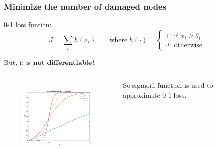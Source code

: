 \documentclass{beamer}
\begin{document}
\begin{frame}
	\frametitle{Minimize the number of damaged nodes}
	0-1 loss funtion:
	\begin{equation}
		\label{eq:0_1_loss}
			J = \sum_i h(x_i) \quad\quad
			\text{where } h(\cdot) = 
			\begin{cases}
				1 & \text{if } x_i \ge \theta_i \\
				0 & \text{otherwise}
			\end{cases}
	\end{equation}

	But, it is \textbf{not differentiable!}\\


	\begin{columns}
		\begin{column}{0.5\textwidth}
			\begin{figure}
			\centering
			\includegraphics[height=40mm]{./figs/sigmoid_small.pdf}		
			\end{figure}
		\end{column}

		\begin{column}{0.5\textwidth}
		So sigmoid function is used to approximate 0-1 loss.
		\end{column}
	\end{columns}
	
\end{frame}
\end{document}
